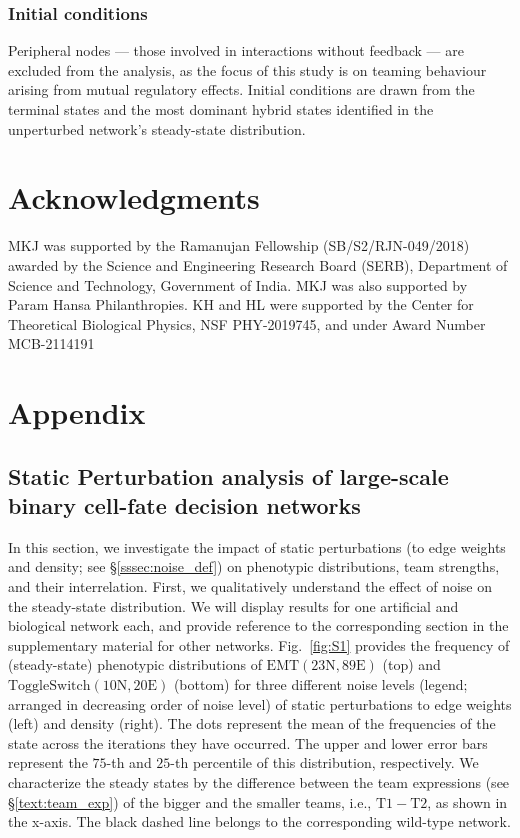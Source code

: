 \documentclass[11pt]{article}
\newcommand{\tseight}{\mathrm{Toggle Switch (10N,20E)}}
\newcommand{\emttwosix}{\mathrm{EMT (23N,89E)}}
\newcommand{\beginsupplement}{%
        \setcounter{table}{0}
        \renewcommand{\thetable}{S\arabic{table}}%
        \setcounter{figure}{0}
        \renewcommand{\thefigure}{S\arabic{figure}}%
        \setcounter{section}{0}
        \renewcommand{\thesection}{S\arabic{section}}%
     }
\begin{document}
\subsubsection{Initial conditions}

Peripheral nodes — those involved in interactions without feedback — are excluded from the analysis, as the focus of this study is on teaming behaviour arising from mutual regulatory effects. Initial conditions are drawn from the terminal states and the most dominant hybrid states identified in the unperturbed network's steady-state distribution.

\section{Acknowledgments}

MKJ was supported by the Ramanujan Fellowship (SB/S2/RJN-049/2018) awarded by the Science and Engineering Research Board (SERB), Department of Science and Technology, Government of India. MKJ was also supported by Param Hansa Philanthropies. KH and HL were supported by the Center for Theoretical Biological Physics, NSF PHY-2019745, and under Award Number MCB-2114191

\printbibliography

\beginsupplement

\section{Appendix}

\subsection{Static Perturbation analysis of large-scale binary cell-fate decision networks} \label{ssec:stat_pert}
In this section, we investigate the impact of static perturbations (to edge weights and density; see \S\ref{sssec:noise_def}) on phenotypic distributions, team strengths, and their interrelation. First, we qualitatively understand the effect of noise on the steady-state distribution. We will display results for one artificial and biological network each, and provide reference to the corresponding section in the supplementary material for other networks. Fig.~\ref{fig:S1} provides the frequency of (steady-state) phenotypic distributions of $\emttwosix$ (top) and $\tseight$ (bottom) for three different noise levels (legend; arranged in decreasing order of noise level) of static perturbations to edge weights (left) and density (right). The dots represent the mean of the frequencies of the state across the iterations they have occurred. The upper and lower error bars represent the $75$-th and $25$-th percentile of this distribution, respectively. We characterize the steady states by the difference between the team expressions (see \S\ref{text:team_exp}) of the bigger and the smaller teams, i.e., $\mathrm{T1-T2}$, as shown in the x-axis. The black dashed line belongs to the corresponding wild-type network. 
\end{document}
